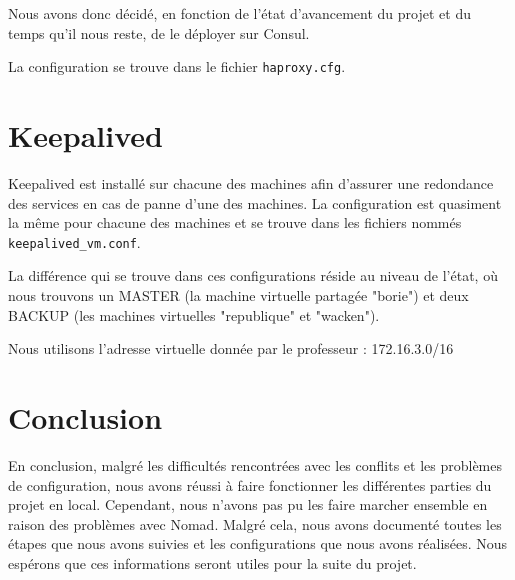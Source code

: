 \documentclass{report}
\begin{document}
Nous avons donc décidé, en fonction de l'état d'avancement du projet et du temps qu'il nous reste, de le déployer sur Consul.

La configuration se trouve dans le fichier \texttt{haproxy.cfg}.

\newpage

\chapter{Keepalived}
Keepalived est installé sur chacune des machines afin d'assurer une redondance des services en cas de panne d'une des machines. La configuration est quasiment la même pour chacune des machines et se trouve dans les fichiers nommés \texttt{keepalived\_vm.conf}.

La différence qui se trouve dans ces configurations réside au niveau de l'état, où nous trouvons un MASTER (la machine virtuelle partagée "borie") et deux BACKUP (les machines virtuelles "republique" et "wacken").

Nous utilisons l'adresse virtuelle donnée par le professeur : 172.16.3.0/16

\newpage

\chapter{Conclusion}
En conclusion, malgré les difficultés rencontrées avec les conflits et les problèmes de configuration, nous avons réussi à faire fonctionner les différentes parties du projet en local. Cependant, nous n'avons pas pu les faire marcher ensemble en raison des problèmes avec Nomad. Malgré cela, nous avons documenté toutes les étapes que nous avons suivies et les configurations que nous avons réalisées. Nous espérons que ces informations seront utiles pour la suite du projet.
\end{document}
